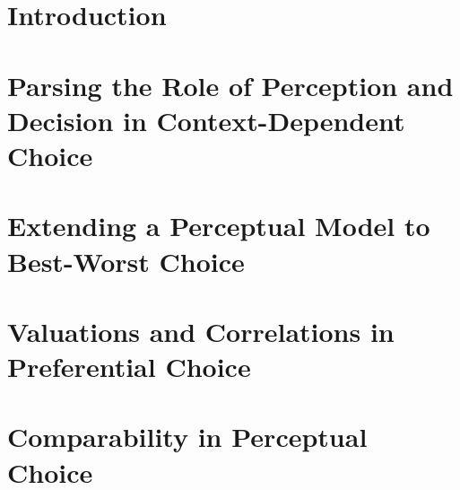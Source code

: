 \documentclass{umassthesis}          %
\begin{document}

\mainmatter   %



\chapter{Introduction}
\label{introduction}


\chapter{Parsing the Role of Perception and Decision in Context-Dependent Choice}
\label{chapter_2}


\chapter{Extending a Perceptual Model to Best-Worst Choice}
\label{chapter_3}


\chapter{Valuations and Correlations in Preferential Choice}
\label{chapter_4}


\chapter{Comparability in Perceptual Choice}
\label{chapter_5}


%


% 


\backmatter  %


\printbibliography
\end{document}
